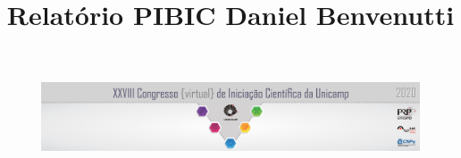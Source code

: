 \documentclass[12pt,a4paper]{article}
\title{Relatório PIBIC Daniel Benvenutti}
\makeatletter
\def\vhrulefill#1{\leavevmode\leaders\hrule\@height#1\hfill \kern\z@}
\makeatother
\begin{document}
\begin{figure}
\begin{center}
    \includegraphics[scale=1]{banner-grande.png}
\end{center}

\end{figure}






\noindent 
\begin{flushright}
\begin{scriptsize}
\hspace{5cm} \\
\hspace{5cm} \\
\hspace{5cm} \\
\hspace{5cm} \\
\hspace{5cm} \\
\hspace{5cm} \\
\end{scriptsize}
\end{flushright}


\end{document}
